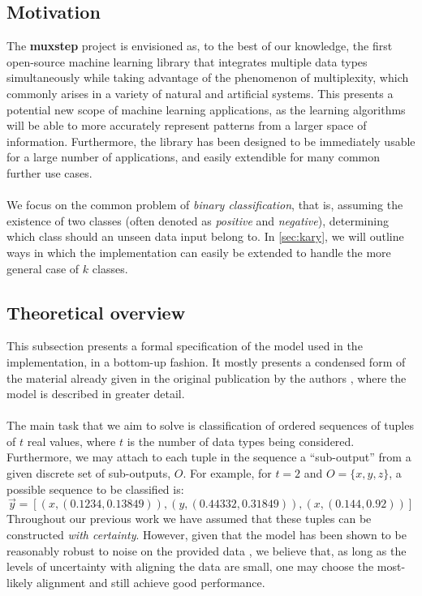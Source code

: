 \documentclass[12pt]{article}
\begin{document}
	\subsection{Motivation}
	
	The {\bf muxstep} project is envisioned as, to the best of our knowledge, the first open-source machine learning library that integrates multiple data types simultaneously while taking advantage of the phenomenon of multiplexity, which commonly arises in a variety of natural and artificial systems. This presents a potential new scope of machine learning applications, as the learning algorithms will be able to more accurately represent patterns from a larger space of information. Furthermore, the library has been designed to be immediately usable for a large number of applications, and easily extendible for many common further use cases.\\ \\
	We focus on the common problem of \emph{binary classification}, that is, assuming the existence of two classes (often denoted as \emph{positive} and \emph{negative}), determining which class should an unseen data input belong to. In \cref{sec:kary}, we will outline ways in which the implementation can easily be extended to handle the more general case of $k$ classes.
	
	\subsection{Theoretical overview}\label{sec:theory}
	
	This subsection presents a formal specification of the model used in the implementation, in a bottom-up fashion. It mostly presents a condensed form of the material already given in the original publication by the authors \cite{Velickovic15}, where the model is described in greater detail.\\ \\ The main task that we aim to solve is classification of ordered sequences of tuples of $t$ real values, where $t$ is the number of data types being considered. Furthermore, we may attach to each tuple in the sequence a ``sub-output'' from a given discrete set of sub-outputs, $O$. For example, for $t = 2$ and $O = \{x, y, z\}$, a possible sequence to be classified is:
	\begin{equation}
		\vec{y} = \left[\left(x, \left(0.1234, 0.13849\right)\right), \left(y, \left(0.44332, 0.31849\right)\right), \left(x, \left(0.144, 0.92\right)\right)\right]
	\end{equation}
	Throughout our previous work we have assumed that these tuples can be constructed \emph{with certainty}. However, given that the model has been shown to be reasonably robust to noise on the provided data \cite{Velickovic15}, we believe that, as long as the levels of uncertainty with aligning the data are small, one may choose the most-likely alignment and still achieve good performance.
	
\end{document}
